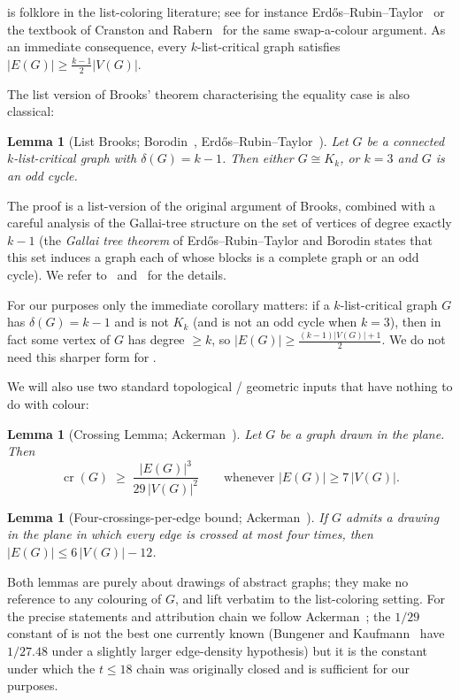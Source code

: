 \documentclass[11pt,a4paper]{article}
\newtheorem{lemma}[theorem]{Lemma}
\theoremstyle{definition}
\DeclareMathOperator{\crN}{cr}
\begin{document}
 is folklore in the list-coloring literature;
see for instance Erd\H{o}s--Rubin--Taylor~\cite[Theorem 2]{ERT} or
the textbook of Cranston and Rabern~\cite{Diestel} for the same
swap-a-colour argument. As an immediate consequence, every
$k$-list-critical graph satisfies
$|E(G)| \ge \tfrac{k-1}{2}|V(G)|$.

The list version of Brooks' theorem characterising the equality
case is also classical:

\begin{lemma}[List Brooks; Borodin~\cite{Borodin1977},
Erd\H{o}s--Rubin--Taylor~\cite{ERT}]\label{lem:list-brooks}
Let $G$ be a connected $k$-list-critical graph with
$\delta(G) = k - 1$. Then either $G \cong K_k$, or $k = 3$ and
$G$ is an odd cycle.
\end{lemma}

The proof is a list-version of the original argument of Brooks,
combined with a careful analysis of the Gallai-tree structure on
the set of vertices of degree exactly $k - 1$ (the \emph{Gallai
tree theorem} of Erd\H{o}s--Rubin--Taylor and
Borodin states that this set induces a graph each of whose blocks
is a complete graph or an odd cycle). We refer
to~\cite[Theorem~3.2 and Theorem~3.5]{ERT}
and~\cite{Borodin1977} for the details.

For our purposes only the immediate corollary matters: if a
$k$-list-critical graph $G$ has $\delta(G) = k - 1$ and is not
$K_k$ (and is not an odd cycle when $k = 3$), then in fact some
vertex of $G$ has degree $\ge k$, so
$|E(G)| \ge \tfrac{(k-1)|V(G)| + 1}{2}$. We do not need this
sharper form for .

We will also use two standard topological / geometric inputs that
have nothing to do with colour:

\begin{lemma}[Crossing Lemma; Ackerman~\cite{Ackerman}]\label{lem:cl}
Let $G$ be a graph drawn in the plane. Then
\[
   \crN(G) \;\ge\; \frac{|E(G)|^{3}}{29\,|V(G)|^{2}}
   \qquad \text{whenever } |E(G)| \ge 7\,|V(G)|.
\]
\end{lemma}

\begin{lemma}[Four-crossings-per-edge bound;
Ackerman~\cite{Ackerman}]\label{lem:fourcrossing}
If $G$ admits a drawing in the plane in which every edge is crossed
at most four times, then $|E(G)| \le 6\,|V(G)| - 12$.
\end{lemma}

Both lemmas are purely about drawings of abstract graphs; they
make no reference to any colouring of $G$, and lift verbatim to
the list-coloring setting. For the precise statements and
attribution chain we follow Ackerman~\cite[Theorem~1.1 and
Theorem~2.1]{Ackerman}; the $1/29$ constant of  is
not the best one currently known (Bungener and
Kaufmann~\cite{BK24} have $1/27.48$ under a slightly larger
edge-density hypothesis) but it is the constant under which the
$t \le 18$ chain was originally closed and is sufficient for our
purposes.
\end{document}
